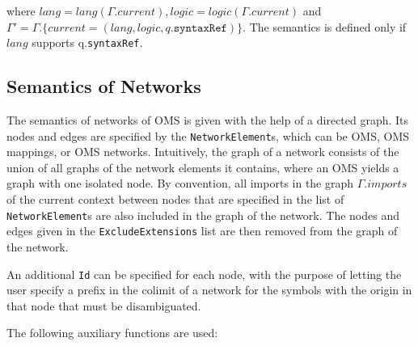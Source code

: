 \documentclass[10pt,fleqn,final]{scrreprt}
\newcommand*{\syntax}[1]{\texttt{#1}}
\newcommand{\current}{\mathit{current}}
\newcommand{\ssclause}[1]{\subsection{#1}}
\begin{document}
\noindent where $lang = lang(\Gamma.\current), logic = logic(\Gamma.\current)$ and\\
$\Gamma'  = \Gamma.\{\current = (lang, logic, q.\syntax{syntaxRef})\}$. 
The semantics is defined only if $\mathit{lang}$ supports q.\syntax{syntaxRef}.

\ssclause{Semantics of Networks}

The semantics of networks of OMS is given with the help of a directed graph. Its nodes
and edges are specified by the \syntax{NetworkElement}s, which can be OMS, OMS mappings, or OMS networks. Intuitively, the graph of a
network consists of the union of all graphs of the network elements it
contains, where an OMS yields a graph with one isolated node. By convention,
all imports in the graph $\Gamma.imports$ of the current context between nodes that are
specified in the list of \syntax{NetworkElement}s are also included in the graph of 
the network. 
The nodes and edges given in the \syntax{ExcludeExtensions} list are then removed from the graph of the network. 

An additional \syntax{Id} can be specified for each node, with the purpose of letting the user specify a 
prefix in the colimit of a network for the symbols with the origin in that node that must be disambiguated.

 The following auxiliary functions are used: 
\end{document}
